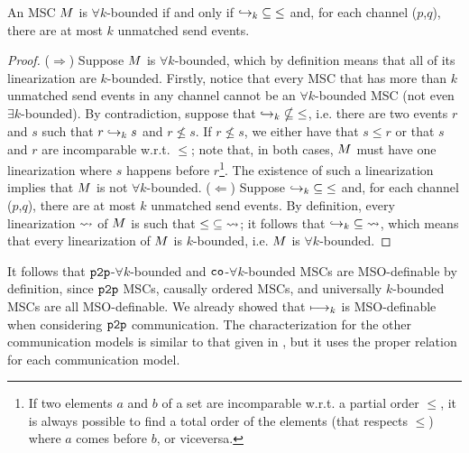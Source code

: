 \begin{proposition}
	An MSC $M$ is $\forall k$-bounded if and only if $\hookrightarrow_{k} \;\subseteq\; \le$ and, for each channel ($p$,$q$), there are at most $k$ unmatched send events.
\end{proposition}
\begin{proof}
	($\Rightarrow$) Suppose $M$ is $\forall k$-bounded, which by definition means that all of its linearization are $k$-bounded. Firstly, notice that every MSC that has more than $k$ unmatched send events in any channel cannot be an $\forall k$-bounded MSC (not even $\exists k$-bounded). By contradiction, suppose that $\hookrightarrow_{k} \;\nsubseteq\; \le$, i.e. there are two events $r$ and $s$ such that $r \hookrightarrow_{k} s$ and $r \nleq s$. If $r \nleq s$, we either have that $s \le r$ or that $s$ and $r$ are incomparable w.r.t. $\le$; note that, in both cases, $M$ must have one linearization where $s$ happens before $r$\footnote{If two elements $a$ and $b$ of a set are incomparable w.r.t. a partial order $\le$, it is always possible to find a total order of the elements (that respects $\le$) where $a$ comes before $b$, or viceversa.}. The existence of such a linearization implies that $M$ is not $\forall k$-bounded.
	($\Leftarrow$) Suppose $\hookrightarrow_{k} \;\subseteq\; \le$ and, for each channel ($p$,$q$), there are at most $k$ unmatched send events. By definition, every linearization $\rightsquigarrow$ of $M$ is such that $\le \;\subseteq\; \rightsquigarrow$; it follows that $\hookrightarrow_{k} \;\subseteq\; \rightsquigarrow$, which means that every linearization of $M$ is $k$-bounded, i.e. $M$ is $\forall k$-bounded.
\end{proof}

It follows that $\mathtt{p2p}$-$\forall k$-bounded and $\mathtt{co}$-$\forall k$-bounded MSCs are MSO-definable by definition, since $\mathtt{p2p}$ MSCs, causally ordered MSCs, and universally $k$-bounded MSCs are all MSO-definable. We already showed that $\longmapsto_k$ is MSO-definable when considering $\mathtt{p2p}$ communication. The characterization for the other communication models is similar to that given in \cite{DBLP:conf/fossacs/LohreyM02}, but it uses the proper relation for each communication model.

